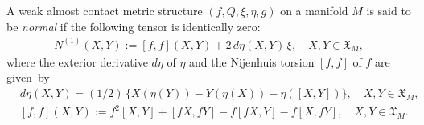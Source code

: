 \documentclass[11pt,a4paper,twoside]{article}
\newtheorem{remark}{Remark}%
\begin{document}
{A weak almost contact metric structure $({f},Q,\xi,\eta, g)$ on a manifold $M$ is said to be {\it normal} if
the following tensor is identically zero:
\begin{align*}%
 N^{(1)}(X,Y) := [{f},{f}](X,Y) + 2\,d\eta(X,Y)\,\xi,\quad X,Y\in\mathfrak{X}_M,
\end{align*}
where the exterior derivative $d\eta$ of $\eta$ and
the Nijenhuis torsion $[{f},{f}]$ of ${f}$
are given~by
\begin{align*}%
 & d\eta(X,Y) = (1/2)\,\{X(\eta(Y)) - Y(\eta(X)) - \eta([X,Y])\},\quad X,Y\in\mathfrak{X}_M, \\
 & [{f},{f}](X,Y) := {f}^2 [X,Y] + [{f} X, {f} Y] - {f}[{f} X,Y] - {f}[X,{f} Y],\quad X,Y\in\mathfrak{X}_M.
\end{align*}
}
\end{document}
